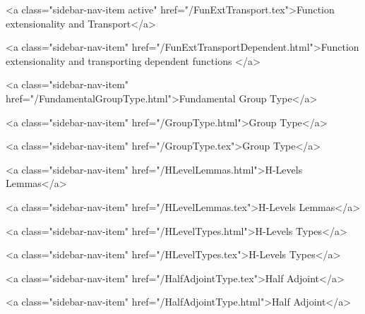       
    
      
        
          <a class="sidebar-nav-item active" href="/FunExtTransport.tex">Function extensionality and Transport</a>
        
      
    
      
        
          <a class="sidebar-nav-item" href="/FunExtTransportDependent.html">Function extensionality and transporting dependent functions </a>
        
      
    
      
        
          <a class="sidebar-nav-item" href="/FundamentalGroupType.html">Fundamental Group Type</a>
        
      
    
      
        
          <a class="sidebar-nav-item" href="/GroupType.html">Group Type</a>
        
      
    
      
        
          <a class="sidebar-nav-item" href="/GroupType.tex">Group Type</a>
        
      
    
      
        
          <a class="sidebar-nav-item" href="/HLevelLemmas.html">H-Levels Lemmas</a>
        
      
    
      
        
          <a class="sidebar-nav-item" href="/HLevelLemmas.tex">H-Levels Lemmas</a>
        
      
    
      
        
          <a class="sidebar-nav-item" href="/HLevelTypes.html">H-Levels Types</a>
        
      
    
      
        
          <a class="sidebar-nav-item" href="/HLevelTypes.tex">H-Levels Types</a>
        
      
    
      
        
          <a class="sidebar-nav-item" href="/HalfAdjointType.tex">Half Adjoint</a>
        
      
    
      
        
          <a class="sidebar-nav-item" href="/HalfAdjointType.html">Half Adjoint</a>
        
